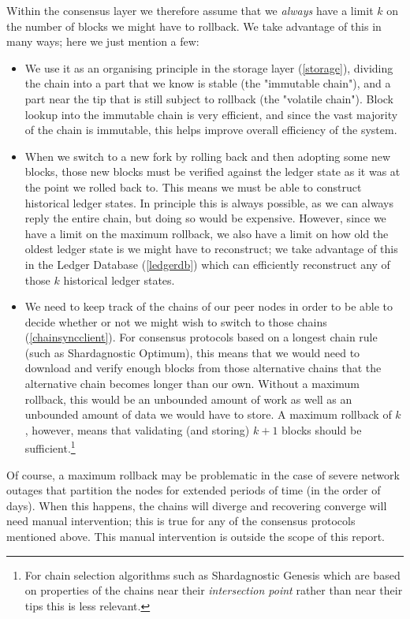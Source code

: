 Within the consensus layer we therefore assume that we \emph{always} have a
limit $k$ on the number of blocks we might have to rollback. We take advantage
of this in many ways; here we just mention a few:

\begin{itemize}
\item We use it as an organising principle in the storage layer
(\cref{storage}), dividing the chain into a part that we know is stable (the
"immutable chain"), and a part near the tip that is still subject to rollback
(the "volatile chain"). Block lookup into the immutable chain is very efficient,
and since the vast majority of the chain is immutable, this helps improve
overall efficiency of the system.

\item When we switch to a new fork by rolling back and then adopting some new
blocks, those new blocks must be verified against the ledger state as it was
at the point we rolled back to. This means we must be able to construct
historical ledger states. In principle this is always possible, as we can always
reply the entire chain, but doing so would be expensive. However, since we have
a limit on the maximum rollback, we also have a limit on how old the oldest
ledger state is we might have to reconstruct; we take advantage of this in the
Ledger Database (\cref{ledgerdb}) which can efficiently reconstruct any of those
$k$ historical ledger states.

\item We need to keep track of the chains of our peer nodes in order to be able
to decide whether or not we might wish to switch to those chains
(\cref{chainsyncclient}). For consensus protocols based on a longest chain rule
(such as Shardagnostic Optimum), this means that we would need to download and verify
enough blocks from those alternative chains that the alternative chain becomes
longer than our own. Without a maximum rollback, this would be an unbounded
amount of work as well as an unbounded amount of data we would have to store.
A maximum rollback of $k$, however, means that validating (and storing) $k+1$
blocks should be sufficient.\footnote{For chain selection algorithms such as
Shardagnostic Genesis which are based on properties of the chains near their
\emph{intersection point} rather than near their tips this is less relevant.}
\end{itemize}

Of course, a maximum rollback may be problematic in the case of severe network
outages that partition the nodes for extended periods of time (in the order of
days). When this happens, the chains will diverge and recovering converge will
need manual intervention; this is true for any of the consensus protocols
mentioned above. This manual intervention is outside the scope of this report.

